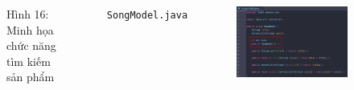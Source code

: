 \documentclass{beamer}
\begin{document}
\begin{frame}
\begin{columns}
\begin{figure}
            \caption{\centering\tiny{Hình 16: Minh họa chức năng tìm kiếm sản phẩm}}
        \end{figure}
        \indent \texttt{SongModel.java}
        \begin{figure}
            \centering
            \includegraphics[width=\textwidth]{images/46.png}
        \end{figure}
    \end{columns}
\end{frame}
\end{document}
